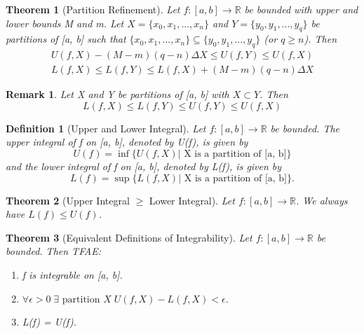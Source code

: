 \documentclass[11pt, oneside]{book}
\theoremstyle{break}
\newtheorem{thm}{Theorem}[section]
\newtheorem*{remark}{Remark}
\newtheorem{defn}{Definition}[section]
\newcommand{\bb}[1]{\mathbb{#1}}			%
\begin{document}
\begin{thm}[Partition Refinement]\label{partition_refinement}
	Let $f: [a, b] \to \bb{R}$ be bounded with upper and lower bounds M and m. Let $X = \{x_0, x_1, ..., x_n\}$ and $Y = \{y_0, y_1, ..., y_q\}$ be partitions of [a, b] such that $\{x_0, x_1, ..., x_n\} \subseteq \{y_0, y_1, ..., y_q\}$ (or $q \geq n$). Then
	\begin{gather*}
		U(f, X) - (M - m)(q - n) \Delta X \leq U(f, Y) \leq U(f, X) \\
		L(f, X) \leq L(f, Y) \leq L(f, X) + (M - m)(q - n) \Delta X
	\end{gather*}
\end{thm}

\begin{remark}
	Let X and Y be partitions of [a, b] with $X \subset Y$. Then
	\[
		L(f, X) \leq L(f, Y) \leq U(f, Y) \leq U(f, X)
	\]
\end{remark}

\begin{defn}[Upper and Lower Integral]
	Let $f: [a, b] \to \bb{R}$ be bounded. The upper integral of f on [a, b], denoted by U(f), is given by
	\[
		U(f) = \inf \{U(f, X) | \text{ X is a partition of [a, b]} \}
	\]
	and the lower integral of f on [a, b], denoted by L(f), is given by
	\[
		L(f) = \sup \{L(f, X) | \text{ X is a partition of [a, b]} \}.
	\]
\end{defn}

\begin{thm}[Upper Integral $\geq$ Lower Integral]
	Let $f: [a, b] \to \bb{R}$. We always have $L(f) \leq U(f)$.
\end{thm}

\begin{thm}[Equivalent Definitions of Integrability]
	Let $f: [a, b] \to \bb{R}$ be bounded. Then TFAE:
	\begin{enumerate}
		\item f is integrable on [a, b].
		\item $\forall \epsilon > 0 \; \exists \text{ partition } X \; U(f, X) - L(f, X) < \epsilon$.
		\item L(f) = U(f).
	\end{enumerate}
\end{thm}
\end{document}
